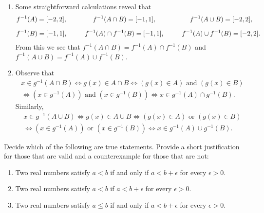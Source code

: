 \documentclass{lew98_solutions}
\begin{document}
\begin{solution}
    \begin{enumerate}
        \item Some straightforward calculations reveal that
        \[
            \begin{gathered}
                f^{-1}(A) = [-2, 2], \\[2mm]
                f^{-1}(B) = [-1, 1],
            \end{gathered}
            \hspace{10mm}
            \begin{gathered}
                f^{-1}(A \cap B) = [-1, 1], \\[2mm]
                f^{-1}(A) \cap f^{-1}(B) = [-1, 1],
            \end{gathered}
            \hspace{10mm}
            \begin{gathered}
                f^{-1}(A \cup B) = [-2, 2], \\[2mm]
                f^{-1}(A) \cup f^{-1}(B) = [-2, 2].
            \end{gathered}
        \]
        From this we see that \( f^{-1}(A \cap B) = f^{-1}(A) \cap f^{-1}(B) \) and \( f^{-1}(A \cup B) = f^{-1}(A) \cup f^{-1}(B) \).

        \item Observe that
        \begin{gather*}
            x \in g^{-1}(A \cap B) \iff g(x) \in A \cap B \iff (g(x) \in A) \text{ and } (g(x) \in B) \\[2mm]
            \iff (x \in g^{-1}(A)) \text{ and } (x \in g^{-1}(B)) \iff x \in g^{-1}(A) \cap g^{-1}(B).
        \end{gather*}
        Similarly,
        \begin{gather*}
            x \in g^{-1}(A \cup B) \iff g(x) \in A \cup B \iff (g(x) \in A) \text{ or } (g(x) \in B) \\[2mm]
            \iff (x \in g^{-1}(A)) \text{ or } (x \in g^{-1}(B)) \iff x \in g^{-1}(A) \cup g^{-1}(B).
        \end{gather*}
    \end{enumerate}
\end{solution}

\begin{exercise}
\label{ex:1.2.10}
    Decide which of the following are true statements. Provide a short justification for those that are valid and a counterexample for those that are not:
    \begin{enumerate}
        \item Two real numbers satisfy \( a < b \) if and only if \( a < b + \epsilon \) for every \( \epsilon > 0 \).

        \item Two real numbers satisfy \( a < b \) if \( a < b + \epsilon \) for every \( \epsilon > 0 \).

        \item Two real numbers satisfy \( a \leq b \) if and only if \( a < b + \epsilon \) for every \( \epsilon > 0 \).
    \end{enumerate}
\end{exercise}
\end{document}
